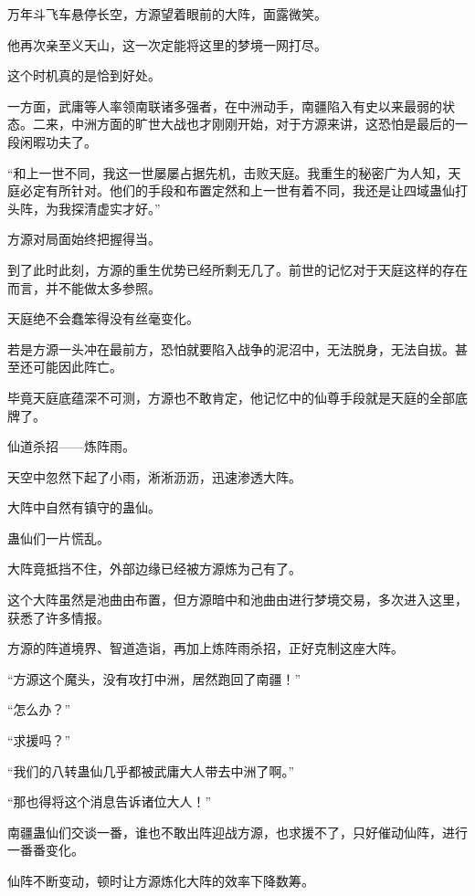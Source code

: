 
\begin{this_body}

万年斗飞车悬停长空，方源望着眼前的大阵，面露微笑。

他再次亲至义天山，这一次定能将这里的梦境一网打尽。

这个时机真的是恰到好处。

一方面，武庸等人率领南联诸多强者，在中洲动手，南疆陷入有史以来最弱的状态。二来，中洲方面的旷世大战也才刚刚开始，对于方源来讲，这恐怕是最后的一段闲暇功夫了。

“和上一世不同，我这一世屡屡占据先机，击败天庭。我重生的秘密广为人知，天庭必定有所针对。他们的手段和布置定然和上一世有着不同，我还是让四域蛊仙打头阵，为我探清虚实才好。”

方源对局面始终把握得当。

到了此时此刻，方源的重生优势已经所剩无几了。前世的记忆对于天庭这样的存在而言，并不能做太多参照。

天庭绝不会蠢笨得没有丝毫变化。

若是方源一头冲在最前方，恐怕就要陷入战争的泥沼中，无法脱身，无法自拔。甚至还可能因此阵亡。

毕竟天庭底蕴深不可测，方源也不敢肯定，他记忆中的仙尊手段就是天庭的全部底牌了。

仙道杀招——炼阵雨。

天空中忽然下起了小雨，淅淅沥沥，迅速渗透大阵。

大阵中自然有镇守的蛊仙。

蛊仙们一片慌乱。

大阵竟抵挡不住，外部边缘已经被方源炼为己有了。

这个大阵虽然是池曲由布置，但方源暗中和池曲由进行梦境交易，多次进入这里，获悉了许多情报。

方源的阵道境界、智道造诣，再加上炼阵雨杀招，正好克制这座大阵。

“方源这个魔头，没有攻打中洲，居然跑回了南疆！”

“怎么办？”

“求援吗？”

“我们的八转蛊仙几乎都被武庸大人带去中洲了啊。”

“那也得将这个消息告诉诸位大人！”

南疆蛊仙们交谈一番，谁也不敢出阵迎战方源，也求援不了，只好催动仙阵，进行一番番变化。

仙阵不断变动，顿时让方源炼化大阵的效率下降数筹。


\end{this_body}
